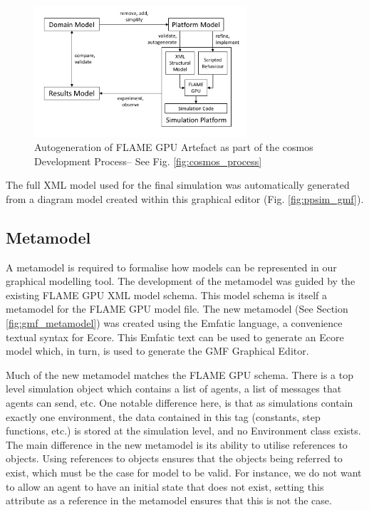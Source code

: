 \documentclass{UoYCSproject}
\begin{document}
\begin{figure}[htp]
\centering
\includegraphics[width=0.7\textwidth]{Appendix/CoSMoS_FLAME}
\caption{Autogeneration of \gls{FLAME GPU} Artefact as part of the \gls{cosmos} Development Process-- See Fig. \ref{fig:cosmos_process}}
\label{fig:flame_improved}
\end{figure}

The full XML model used for the final simulation was automatically generated from a diagram model created within this graphical editor (Fig. \ref{fig:ppsim_gmf}).

\subsection{Metamodel}
A metamodel is required to formalise how models can be represented in our graphical modelling tool.
The development of the metamodel was guided by the existing \gls{FLAME GPU} XML model schema.
This model schema is itself a metamodel for the \gls{FLAME GPU} model file.
The new metamodel (See Section \ref{fig:gmf_metamodel}) was created using the Emfatic language, a convenience textual syntax for Ecore.
This Emfatic text can be used to generate an Ecore model which, in turn, is used to generate the GMF Graphical Editor.

Much of the new metamodel matches the \gls{FLAME GPU} schema.
There is a top level simulation object which contains a list of agents, a list of messages that agents can send, etc.
One notable difference here, is that as simulations contain exactly one environment, the data contained in this tag (constants, step functions, etc.) is stored at the simulation level, and no Environment class exists.
The main difference in the new metamodel is its ability to utilise references to objects.
Using references to objects ensures that the objects being referred to exist, which must be the case for model to be valid.
For instance, we do not want to allow an agent to have an initial state that does not exist, setting this attribute as a reference in the metamodel ensures that this is not the case.
\end{document}
